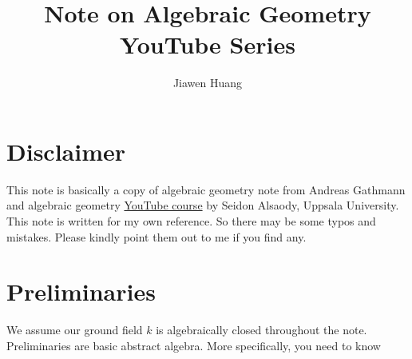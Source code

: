 \documentclass[15pt]{scrartcl}
\begin{document}
\title{Note on Algebraic Geometry YouTube Series}
\author{Jiawen Huang}
\maketitle
\tableofcontents
\newpage
\section{Disclaimer}
This note is basically a copy of algebraic geometry note from Andreas Gathmann and algebraic geometry \href{https://www.youtube.com/playlist?list=PLn6dA-hP_G8SR-v8EV5m9vcpo-V9No-2V}{YouTube course} by Seidon Alsaody, Uppsala University. This note is written for my own reference. So there may be some typos and mistakes. Please kindly point them out to me if you find any.
\newpage 
\section{Preliminaries}
We assume our ground field $k$ is algebraically closed throughout the note.
\\
Preliminaries are basic abstract algebra. More specifically, you need to know 
\end{document}
